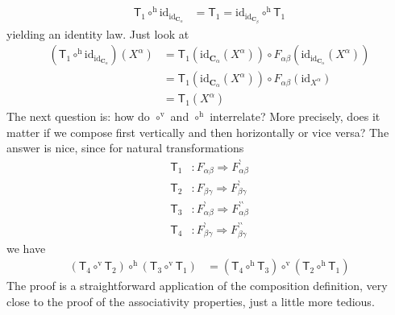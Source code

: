 \begin{align*}
  \mathsf{T}_{1}
  \circ^{\textrm{h}}
  \mathrm{id}_{\mathrm{id}_{\mathbf{C}_{\alpha}}}
  &=
  \mathsf{T}_{1}
  =
  \mathrm{id}_{\mathrm{id}_{\mathbf{C}_{\beta}}}
  \circ^{\textrm{h}}
  \mathsf{T}_{1}
\end{align*}
yielding an identity law.
Just look at
\begin{align*}
  \left(
    \mathsf{T}_{1}
    \circ^{\textrm{h}}
    \mathrm{id}_{\mathrm{id}_{\mathbf{C}_{\alpha}}}
  \right)
  (X^{\alpha})
  &=
  \mathsf{T}_{1}
  \left(
    \mathrm{id}_{\mathbf{C}_{\alpha}}(X^{\alpha})
  \right)
  \circ
  F_{\alpha\beta}
  \left(
    \mathrm{id}_{\mathrm{id}_{\mathbf{C}_{\alpha}}}(X^{\alpha})
  \right)
  \\
  &=
  \mathsf{T}_{1}
  \left(
    \mathrm{id}_{\mathbf{C}_{\alpha}}(X^{\alpha})
  \right)
  \circ
  F_{\alpha\beta}
  \left(
    \mathrm{id}_{X^{\alpha}}
  \right)
  \\
  &=
  \mathsf{T}_{1}(X^{\alpha})
\end{align*}
The next question is: how do $\circ^{\textrm{v}}$ and $\circ^{\textrm{h}}$ interrelate?
More precisely, does it matter if we compose first vertically and then horizontally or vice versa?
The answer is nice, since for natural transformations
\begin{align*}
  \mathsf{T}_{1}
  &\colon
  F_{\alpha\beta}
  \Rightarrow
  F_{\alpha\beta}^{\backprime}
  \\
  \mathsf{T}_{2}
  &\colon
  F_{\beta\gamma}
  \Rightarrow
  F_{\beta\gamma}^{\backprime}
  \\
  \mathsf{T}_{3}
  &\colon
  F_{\alpha\beta}^{\backprime}
  \Rightarrow
  F_{\alpha\beta}^{\backprime\backprime}
  \\
  \mathsf{T}_{4}
  &\colon
  F_{\beta\gamma}^{\backprime}
  \Rightarrow
  F_{\beta\gamma}^{\backprime\backprime}
\end{align*}
we have
\begin{align*}
  \left(
    \mathsf{T}_{4}
    \circ^{\textrm{v}}
    \mathsf{T}_{2}
  \right)
  \circ^{\textrm{h}}
  \left(
    \mathsf{T}_{3}
    \circ^{\textrm{v}}
    \mathsf{T}_{1}
  \right)
  &=
  \left(
    \mathsf{T}_{4}
    \circ^{\textrm{h}}
    \mathsf{T}_{3}
  \right)
  \circ^{\textrm{v}}
  \left(
    \mathsf{T}_{2}
    \circ^{\textrm{h}}
    \mathsf{T}_{1}
  \right)
\end{align*}
The proof is a straightforward application of the composition definition, very close to the proof of the associativity properties, just a little more tedious.
